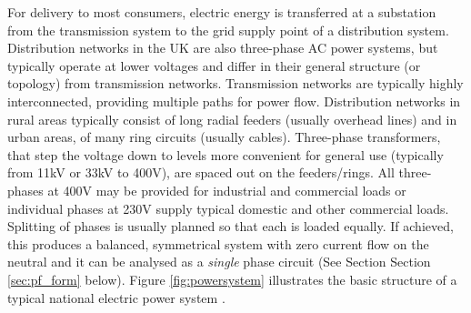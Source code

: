 
For delivery to most consumers, electric energy is transferred at a substation
from the transmission system to the grid supply point of a distribution system.
Distribution networks in the UK are also three-phase AC power systems, but
typically operate at lower voltages and differ in their general structure (or
topology) from transmission networks.  Transmission networks are typically
highly interconnected, providing multiple paths for power flow. Distribution
networks in rural areas typically consist of long radial feeders (usually
overhead lines) and in urban areas, of many ring circuits (usually cables).
Three-phase transformers, that step the voltage down to levels more convenient
for general use (typically from 11kV or 33kV to 400V), are spaced out on the
feeders/rings. All three-phases at 400V may be provided for industrial and
commercial loads or individual phases at 230V supply typical domestic and other
commercial loads. Splitting of phases is usually planned so that each is loaded
equally. If achieved, this produces a balanced, symmetrical system with zero
current flow on the neutral and it can be analysed as a \textit{single} phase
circuit (See Section Section \ref{sec:pf_form} below).  Figure
\ref{fig:powersystem} illustrates the basic structure of a typical national
electric power system \cite{blackout04}.

